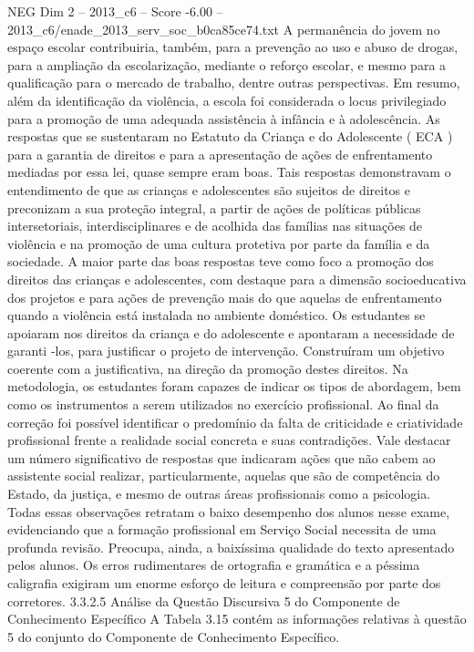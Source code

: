 \begin{textsample}{NEG Dim 2 – 2013\_c6 – Score -6.00 – 2013\_c6/enade\_2013\_serv\_soc\_b0ca85ce74.txt}
A permanência do jovem no espaço escolar contribuiria, também, para a prevenção ao uso e abuso de drogas, para a ampliação da escolarização, mediante o reforço escolar, e mesmo para a qualificação para o mercado de trabalho, dentre outras perspectivas.
Em resumo, além da identificação da violência, a escola foi considerada o locus privilegiado para a promoção de uma adequada assistência à infância e à adolescência.
As respostas que se sustentaram no Estatuto da Criança e do Adolescente ( ECA ) para a garantia de direitos e para a apresentação de ações de enfrentamento mediadas por essa lei, quase sempre eram boas.
Tais respostas demonstravam o entendimento de que as crianças e adolescentes são sujeitos de direitos e preconizam a sua proteção integral, a partir de ações de políticas públicas intersetoriais, interdisciplinares e de acolhida das famílias nas situações de violência e na promoção de uma cultura protetiva por parte da família e da sociedade.
A maior parte das boas respostas teve como foco a promoção dos direitos das crianças e adolescentes, com destaque para a dimensão socioeducativa dos projetos e para ações de prevenção mais do que aquelas de enfrentamento quando a violência está instalada no ambiente doméstico.
Os estudantes se apoiaram nos direitos da criança e do adolescente e apontaram a necessidade de garanti -los, para justificar o projeto de intervenção.
Construíram um objetivo coerente com a justificativa, na direção da promoção destes direitos.
Na metodologia, os estudantes foram capazes de indicar os tipos de abordagem, bem como os instrumentos a serem utilizados no exercício profissional.
Ao final da correção foi possível identificar o predomínio da falta de criticidade e criatividade profissional frente a realidade social concreta e suas contradições.
Vale destacar um número significativo de respostas que indicaram ações que não cabem ao assistente social realizar, particularmente, aquelas que são de competência do Estado, da justiça, e mesmo de outras áreas profissionais como a psicologia.
Todas essas observações retratam o baixo desempenho dos alunos nesse exame, evidenciando que a formação profissional em Serviço Social necessita de uma profunda revisão.
Preocupa, ainda, a baixíssima qualidade do texto apresentado pelos alunos.
Os erros rudimentares de ortografia e gramática e a péssima caligrafia exigiram um enorme esforço de leitura e compreensão por parte dos corretores. 3.3.2.5 Análise da Questão Discursiva 5 do Componente de Conhecimento Específico A Tabela 3.15 contém as informações relativas à questão 5 do conjunto do Componente de Conhecimento Específico.

\end{textsample}

